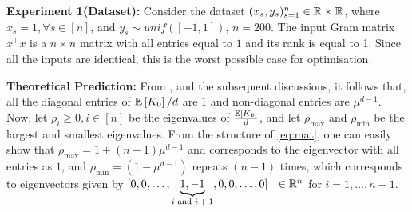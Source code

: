 \textbf{Experiment 1(Dataset):} Consider the dataset $(x_s,y_s)_{s=1}^n\in \mathbb{R}\times \mathbb{R}$, where $x_s=1,\forall s\in [n]$, and $y_s\sim unif([-1,1])$, $n=200$. The input Gram matrix $x^\top x$ is a $n\times n$ matrix with all entries equal to $1$ and its rank is equal to 1. Since all the inputs are identical, this is the worst possible case for optimisation.

\textbf{Theoretical Prediction:} From , and the subsequent discussions, it follows that, all the diagonal entries of $\mathbb{E}\left[K_0\right]/d$ are $1$ and non-diagonal entries are $\mu^{d-1}$. Now, let $\rho_i\geq 0,i \in [n]$ be the eigenvalues of $\frac{\mathbb{E}\left[K_0\right]}{d}$, and let $\rho_{\max}$ and $\rho_{\min}$ be the largest and smallest eigenvalues. From the structure of \eqref{eq:mat}, one can easily show that $\rho_{\max}=1+(n-1)\mu^{d-1}$ and corresponds to the eigenvector with all entries as $1$, and $\rho_{\min}=(1-\mu^{d-1})$ repeats $(n-1)$ times, which corresponds to eigenvectors given by $[0, 0, \ldots, \underbrace{1, -1}_{\text{$i$ and $i+1$}}, 0,0,\ldots, 0]^\top \in \mathbb{R}^n$ for $i=1,\ldots,n-1$.

